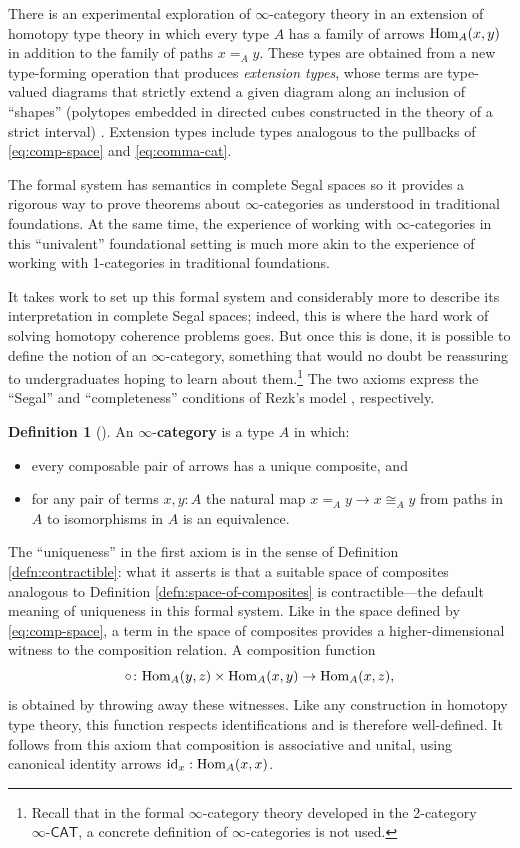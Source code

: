 \documentclass[11pt]{ctexart}
\theoremstyle{definition}
\newtheorem{defn}[thm]{Definition}
\theoremstyle{remark}
\numberwithin{equation}{section}
\newcommand{\id}{\textup{id}}
\newcommand{\Hom}{\textup{Hom}}
\newcommand{\ooCAT}{\infty\text{-}\mathsf{CAT}}
\newcommand{\1}{\mathbbe{1}}
\newcommand{\2}{\mathbbe{2}}
\newcommand{\3}{\mathbbe{3}}
\begin{document}
There is an experimental exploration  of $\infty$-category theory \cite{RS,BuW,CBM} in an extension of homotopy type theory in which every type $A$  has a family of arrows $\Hom_A(x,y)$  in addition to the family of paths $x=_Ay$. These types are obtained from a new type-forming operation that produces  \emph{extension types}, whose terms are type-valued diagrams that strictly extend a given diagram along an inclusion of ``shapes'' (polytopes embedded in directed
cubes constructed in the theory of a strict interval) \cite[\S2-4]{RS}. Extension types include types analogous to the pullbacks of \eqref{eq:comp-space} and \eqref{eq:comma-cat}.

The formal system has semantics in complete Segal spaces \cite{RS,Weinberger} so it provides a rigorous way to prove theorems about $\infty$-categories as understood in traditional foundations. At the same time, the experience of working with $\infty$-categories in this ``univalent'' foundational setting is much more akin to the experience of working with 1-categories in traditional foundations.

It takes work to set up this formal system and considerably more to describe its interpretation in complete Segal spaces; indeed, this is where the hard work of solving homotopy coherence problems goes. But once this is done,  it is possible to define the notion of an $\infty$-category, something that would no doubt be reassuring to undergraduates hoping to learn about them.\footnote{Recall that in the formal $\infty$-category theory developed in the 2-category $\ooCAT$, a concrete definition of $\infty$-categories is not used.} The two axioms express the ``Segal'' and ``completeness'' conditions of Rezk's model \cite{rezk-CSS}, respectively. 

\begin{defn}[{\cite[5.3,10.6]{RS}}] An $\infty$-\textbf{category} is a type $A$ in which:
    \begin{itemize}
        \item every composable pair of arrows has a unique composite, and
        \item for any pair of terms $x, y : A$ the natural map $x=_A y \to x \cong_A y$ from paths in $A$ to isomorphisms in $A$ is an equivalence.
    \end{itemize}
\end{defn}

The ``uniqueness'' in the first axiom is in the sense of Definition \ref{defn:contractible}: what it asserts is that a suitable space of composites analogous to Definition \ref{defn:space-of-composites} is contractible---the default meaning of uniqueness in this formal system. Like in the space defined by \eqref{eq:comp-space}, a term in the space of composites provides a higher-dimensional witness to the composition relation. A composition function \[\circ \colon \Hom_A(y,z) \times \Hom_A(x,y) \to \Hom_A(x,z),\] is obtained by throwing away these witnesses. Like any construction in homotopy type theory, this function respects identifications and is therefore well-defined. It follows from this axiom that composition is associative and unital, using canonical identity arrows $\id_x : \Hom_A(x,x)$.
\end{document}
